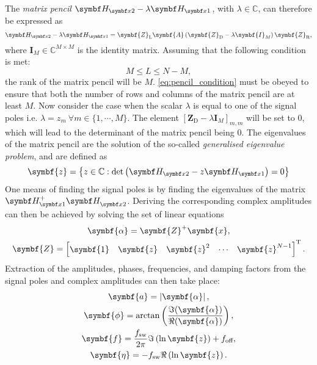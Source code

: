 The \emph{matrix pencil} $\Hxtwo - \lambda\Hxone$, with $\lambda \in
\mathbb{C}$, can therefore be expressed as
\begin{equation}
    \Hxtwo - \lambda \Hxone = \symbf{Z}_{\text{L}} \symbf{A} \left(
        \symbf{Z}_{\text{D}} - \lambda \symbf{I}_M
    \right) \symbf{Z}_{\text{R}},
\end{equation}
where $\symbf{I}_M \in \mathbb{C}^{M \times M}$ is the identity matrix.
Assuming that the following condition is met:
\begin{equation}
    M \leq L \leq N - M,\label{eq:pencil_condition}
\end{equation}
the rank of the matrix pencil will be $M$. \cref{eq:pencil_condition}
must be obeyed to ensure that both the number of rows and columns of the matrix
pencil are at least $M$. Now consider the case when the scalar $\lambda$ is
equal to one of the signal poles i.e.  $\lambda = z_m\ \forall m \in
\lbrace 1, \cdots, M \rbrace$. The element $[\symbf{Z}_{\text{D}} -
\lambda \symbf{I}_M]_{m,m}$ will be set to $0$, which will lead to the
determinant of the matrix pencil being $0$. The eigenvalues of the matrix
pencil are the solution of the so-called \emph{generalised eigenvalue problem},
and are defined as\cite[Section 7.7]{Golub2013}
\begin{equation}
    \symbf{z} = \left\lbrace
        z \in \mathbb{C} : \det\left(\Hxtwo - z \Hxone\right) = 0
    \right\rbrace
\end{equation}
One means of finding the signal poles is by finding the eigenvalues of the
matrix $\Hxone^+ \Hxtwo^{\vphantom{+}}$. Deriving the corresponding complex
amplitudes can then be achieved by solving the set of linear equations
\begin{subequations}
    \begin{gather}
        \symbf{\alpha} = \symbf{Z}^+ \symbf{x},\\
        \symbf{Z} =
        \begin{bmatrix}
            \symbf{1} &
            {\symbf{z}} &
            {\symbf{z}}^2 &
            \cdots &
            {\symbf{z}}^{N-1}
        \end{bmatrix}\T.
    \end{gather}
    \label{eq:comp-amps}
\end{subequations}
Extraction of the amplitudes, phases, frequencies, and damping factors from the
signal poles and complex amplitudes can then take place:
\begin{subequations}
    \begin{gather}
        \symbf{a} = \left \lvert \symbf{\alpha} \right \rvert,\\
        \symbf{\phi} = \arctan \left(\frac{\Im (\symbf{\alpha})}{\Re(\symbf{\alpha})}\right),\\
        \symbf{f} = \frac{\fsw}{2 \pi} \Im\left(\ln \symbf{z} \right) + \foff, \\
        \symbf{\eta} = -\fsw \Re\left(\ln \symbf{z}\right).
    \end{gather}
\end{subequations}

